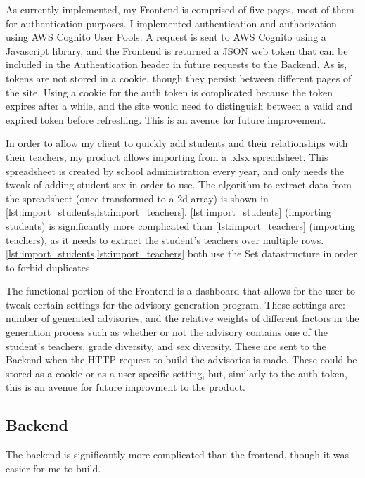 \documentclass{paper}
\begin{document}
As currently implemented, my Frontend is comprised of five pages, most of them for authentication purposes.
I implemented authentication and authorization using AWS Cognito User Pools.
A request is sent to AWS Cognito using a Javascript library, and the Frontend is returned a JSON web token that can be included in the Authentication header in future requests to the Backend.
As is, tokens are not stored in a cookie, though they persist between different pages of the site.
Using a cookie for the auth token is complicated because the token expires after a while, and the site would need to distinguish between a valid and expired token before refreshing.
This is an avenue for future improvement.

In order to allow my client to quickly add students and their relationships with their teachers, my product allows importing from a .xlsx spreadsheet.
This spreadsheet is created by school administration every year, and only needs the tweak of adding student sex in order to use.
The algorithm to extract data from the spreadsheet (once transformed to a 2d array) is shown in \cref{lst:import_students,lst:import_teachers}.
\cref{lst:import_students} (importing students) is significantly more complicated than \cref{lst:import_teachers} (importing teachers), as it needs to extract the student's teachers over multiple rows.
\cref{lst:import_students,lst:import_teachers} both use the Set datastructure in order to forbid duplicates.





The functional portion of the Frontend is a dashboard that allows for the user to tweak certain settings for the advisory generation program.
These settings are: number of generated advisories, and the relative weights of different factors in the generation process such as whether or not the advisory contains one of the student's teachers, grade diversity, and sex diversity.
These are sent to the Backend when the HTTP request to build the advisories is made.
These could be stored as a cookie or as a user-specific setting, but, similarly to the auth token, this is an avenue for future improvment to the product.

\subsection{Backend}
\label{subsec:backend}
The backend is significantly more complicated than the frontend, though it was easier for me to build.
\end{document}
